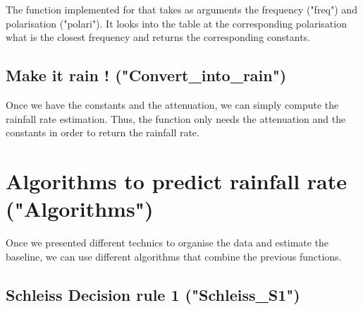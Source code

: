 \documentclass[a4wide,12pt]{article}
\begin{document}
The function implemented for that takes as arguments the frequency ("freq") and polarisation ("polari"). It looks into the table at the corresponding polarisation what is the closest frequency and returns the corresponding constants.

\subsection{Make it rain ! ("Convert\_into\_rain")}
Once we have the constants and the attenuation, we can simply compute the rainfall rate estimation. Thus, the function only needs the attenuation and the constants in order to return the rainfall rate. 

\section{Algorithms to predict rainfall rate ("Algorithms")}
Once we presented different technics to organise the data and estimate the baseline, we can use different algorithms that combine the previous functions. 

\subsection{Schleiss Decision rule 1 ("Schleiss\_S1")}
\end{document}
